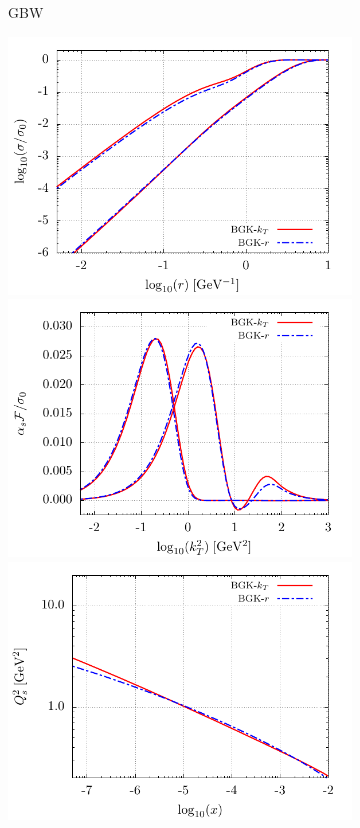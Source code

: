 \documentclass[11pt]{article}
\begin{document}
\begin{figure}[p]
\begin{multicols}{2}
\begin{subfigure}{0.5\textwidth}
    \caption{GBW}
    \label{fig:GBW}
\end{subfigure}
\begin{subfigure}{0.5\textwidth}
    \includegraphics[width=\textwidth]{./plots/BGK-dipole.pdf}
    \includegraphics[width=\textwidth]{./plots/BGK-gluon.pdf}
    \includegraphics[width=\textwidth]{./plots/BGK-saturation.pdf}

\end{subfigure}
\end{multicols}
\end{figure}
\end{document}
